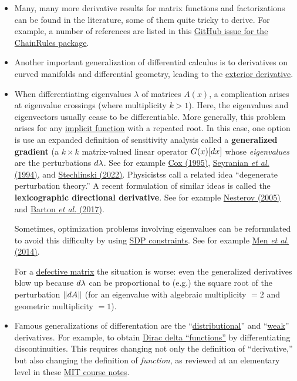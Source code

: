 \begin{itemize}
    \item Many, many more derivative results for matrix functions and factorizations can be found in the literature, some of them quite tricky to derive. For example, a number of references are listed in this \href{https://github.com/JuliaDiff/ChainRules.jl/issues/117}{GitHub issue for the ChainRules package}.
    \item Another important generalization of differential calculus is to derivatives on curved manifolds and differential geometry, leading to the \href{https://en.wikipedia.org/wiki/Exterior_derivative}{exterior derivative}.
    \item When differentiating eigenvalues $\lambda$ of matrices $A(x)$, a complication arises at eigenvalue crossings (where multiplicity $k>1$). Here, the eigenvalues and eigenvectors usually cease to be differentiable. More generally, this problem arises for any \href{https://en.wikipedia.org/wiki/Implicit_function}{implicit function} with a repeated root. In this case, one option is use an expanded definition of sensitivity analysis called a \textbf{generalized gradient} (a $k\times k$ matrix-valued linear operator $G(x) [d x]$ whose \textit{eigenvalues} are the perturbations $d \lambda$. See for example \href{https://doi.org/10.1006/jfan.1995.1117}{Cox (1995)}, \href{https://doi.org/10.1007/BF01742705}{Seyranian \textit{et al.} (1994)}, and \href{https://doi.org/10.1016/j.laa.2022.04.019}{Stechlinski (2022)}. Physicistss call a related idea ``degenerate perturbation theory.'' A recent formulation of similar ideas is called the \textbf{lexicographic directional derivative}. See for example \href{https://doi.org/10.1007/s10107-005-0633-0}{Nesterov (2005)} and \href{https://doi.org/10.1080/10556788.2017.1374385}{Barton \textit{et al.} (2017)}.

    Sometimes, optimization problems involving eigenvalues can be reformulated to avoid this difficulty by using \href{https://en.wikipedia.org/wiki/Semidefinite_programming}{SDP constraints}. See for example \href{http://doi.org/10.1364/OE.22.022632}{Men \textit{et al.} (2014)}.

    For a \href{https://en.wikipedia.org/wiki/Defective_matrix}{defective matrix} the situation is worse: even the generalized derivatives blow up because $d \lambda$ can be proportional to (e.g.) the square root of the perturbation $\lVert d A\rVert$ (for an eigenvalue with algebraic multiplicity $=2$ and geometric multiplicity $=1$).

    \item Famous generalizations of differentation are the ``\href{https://en.wikipedia.org/wiki/Distributional_derivative}{distributional}'' and ``\href{https://en.wikipedia.org/wiki/Weak_derivative}{weak}'' derivatives. For example, to obtain \href{https://en.wikipedia.org/wiki/Dirac_delta_function}{Dirac delta ``functions''} by differentiating discontinuities. This requires changing not only the definition of ``derivative,'' but also changing the definition of \textit{function}, as reviewed at an elementary level in these \href{https://math.mit.edu/~stevenj/18.303/delta-notes.pdf}{MIT course notes}.
\end{itemize}